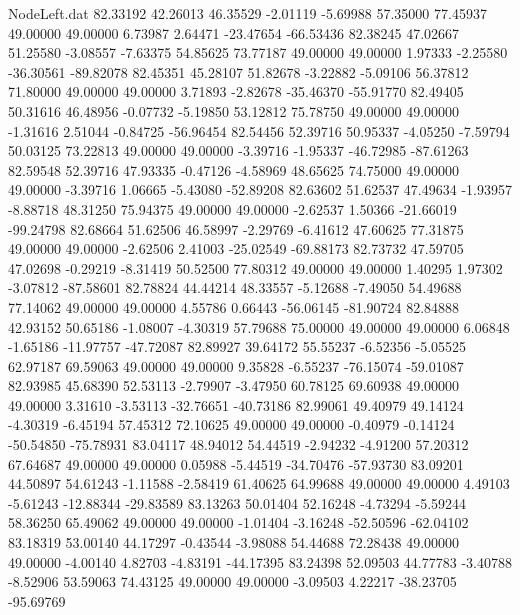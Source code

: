 \begin{filecontents}{NodeLeft.dat}
  82.33192   42.26013   46.35529    -2.01119   -5.69988   57.35000   77.45937   49.00000   49.00000    6.73987    2.64471  -23.47654  -66.53436
  82.38245   47.02667   51.25580    -3.08557   -7.63375   54.85625   73.77187   49.00000   49.00000    1.97333   -2.25580  -36.30561  -89.82078
  82.45351   45.28107   51.82678    -3.22882   -5.09106   56.37812   71.80000   49.00000   49.00000    3.71893   -2.82678  -35.46370  -55.91770
  82.49405   50.31616   46.48956    -0.07732   -5.19850   53.12812   75.78750   49.00000   49.00000   -1.31616    2.51044   -0.84725  -56.96454
  82.54456   52.39716   50.95337    -4.05250   -7.59794   50.03125   73.22813   49.00000   49.00000   -3.39716   -1.95337  -46.72985  -87.61263
  82.59548   52.39716   47.93335    -0.47126   -4.58969   48.65625   74.75000   49.00000   49.00000   -3.39716    1.06665   -5.43080  -52.89208
  82.63602   51.62537   47.49634    -1.93957   -8.88718   48.31250   75.94375   49.00000   49.00000   -2.62537    1.50366  -21.66019  -99.24798
  82.68664   51.62506   46.58997    -2.29769   -6.41612   47.60625   77.31875   49.00000   49.00000   -2.62506    2.41003  -25.02549  -69.88173
  82.73732   47.59705   47.02698    -0.29219   -8.31419   50.52500   77.80312   49.00000   49.00000    1.40295    1.97302   -3.07812  -87.58601
  82.78824   44.44214   48.33557    -5.12688   -7.49050   54.49688   77.14062   49.00000   49.00000    4.55786    0.66443  -56.06145  -81.90724
  82.84888   42.93152   50.65186    -1.08007   -4.30319   57.79688   75.00000   49.00000   49.00000    6.06848   -1.65186  -11.97757  -47.72087
  82.89927   39.64172   55.55237    -6.52356   -5.05525   62.97187   69.59063   49.00000   49.00000    9.35828   -6.55237  -76.15074  -59.01087
  82.93985   45.68390   52.53113    -2.79907   -3.47950   60.78125   69.60938   49.00000   49.00000    3.31610   -3.53113  -32.76651  -40.73186
  82.99061   49.40979   49.14124    -4.30319   -6.45194   57.45312   72.10625   49.00000   49.00000   -0.40979   -0.14124  -50.54850  -75.78931
  83.04117   48.94012   54.44519    -2.94232   -4.91200   57.20312   67.64687   49.00000   49.00000    0.05988   -5.44519  -34.70476  -57.93730
  83.09201   44.50897   54.61243    -1.11588   -2.58419   61.40625   64.99688   49.00000   49.00000    4.49103   -5.61243  -12.88344  -29.83589
  83.13263   50.01404   52.16248    -4.73294   -5.59244   58.36250   65.49062   49.00000   49.00000   -1.01404   -3.16248  -52.50596  -62.04102
  83.18319   53.00140   44.17297    -0.43544   -3.98088   54.44688   72.28438   49.00000   49.00000   -4.00140    4.82703   -4.83191  -44.17395
  83.24398   52.09503   44.77783    -3.40788   -8.52906   53.59063   74.43125   49.00000   49.00000   -3.09503    4.22217  -38.23705  -95.69769

\end{filecontents}
